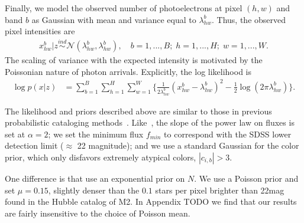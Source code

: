 Finally, we model the observed number of photoelectrons at pixel $(h,w)$ and band $b$ as Gaussian
with mean and variance equal to $\lambda^b_{hw}$. 
Thus, the observed pixel intensities are
\begin{align}
  x_{hw}^b | z \overset{ind}{\sim} \mathcal{N}(\lambda^b_{hw}, \lambda^b_{hw}),
  \quad 
  b = 1, ..., B; \;
  h = 1,..., H; \; 
  w = 1, ..., W. 
\end{align}
The scaling of variance with the expected intensity is motivated by the Poissonian nature of photon arrivals. 
Explicitly, the log likelihood is
\begin{align}
    \log p(x | z) &= \sum_{b = 1}^{B} \sum_{h = 1}^H \sum_{w = 1}^W 
        \Big\{\frac{1}{2\lambda^b_{hw}}(x_{hw}^b  - \lambda^b_{hw})^2 - 
               \frac{1}{2}\log(2\pi\lambda^b_{hw})\Big\}
    \label{eq:loglik}.
\end{align}

The likelihood and priors described above are similar to those
in previous probabilistic cataloging methods~\cite{Brewer_2013, Portillo_2017, Feder_2019, regier2019_celeste}. Like~\cite{Portillo_2017, Feder_2019}, the slope of the power law on fluxes is set at  $\alpha = 2$; we set the minimum flux $f_{min}$ to correspond with the SDSS 
lower detection limit ($\approx$ 22 magnitude); and we use a standard Gaussian for the color prior, which only disfavors extremely atypical colors, $|c_{i,b}| > 3$. 

One difference is that \cite{Portillo_2017, Feder_2019} use an exponential prior on $N$. We use a Poisson prior and set $\mu = 0.15$, slightly denser than the $0.1$ stars per pixel 
brighter than 22mag found in the Hubble catalog of M2. In Appendix TODO we find that our results are fairly insensitive to the choice of Poisson mean. 

